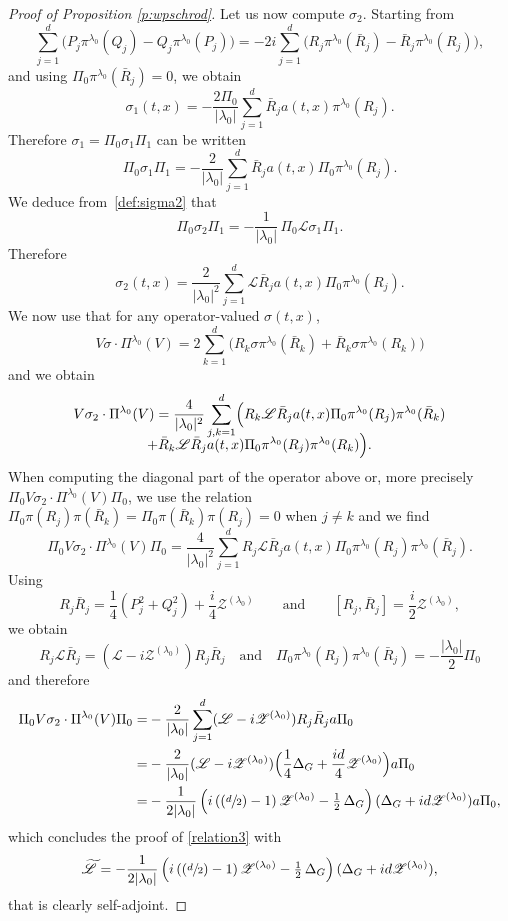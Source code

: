 \documentclass[JEP,XML,SOM,Unicode,published]{cedram}
\let\mathcal\mathscr
\newcommand{\Psfrac}[2]{(\sfrac{#1}{#2})}
\theoremstyle{plain}
\theoremstyle{definition}
\begin{document}
\begin{proof}[Proof of Proposition \ref{p:wpschrod}]
Let us now compute $\sigma_2$. Starting from
\[
\sum_{j=1}^d\bigl(P_j\pi^{\lambda_0}(Q_j)-Q_j \pi^{\lambda_0}(P_j)\bigr)
= -2 i \sum_{j=1}^d \bigl(R_j\pi^{\lambda_0}(\bar R_j)-\bar R_j \pi^{\lambda_0}(R_j)\bigr),
\]
and using $\Pi_0 \pi^{\lambda_0}(\bar R_j)=0$, we obtain
\[
\sigma_1(t,x)=-\frac{2\Pi_0}{|\lambda_0|} \sum_{j=1}^d \bar R_j a(t,x)\pi^{\lambda_0}(R_j).
\]
Therefore $\sigma_1=\Pi_0 \sigma_1 \Pi_1$ can be written
\[
\Pi_0 \sigma_1 \Pi_{1} = -\frac 2{|\lambda_0|} \sum_{j=1}^d \bar R_j a(t,x)\Pi_0\pi^{\lambda_0}(R_j).
\]
We deduce from~\eqref{def:sigma2} that
\[
\Pi_0 \sigma_2 \Pi_{1} =- \frac{1}{|\lambda_0|}\, \Pi_0\mathcal{L} \sigma_1\Pi_{1}.
\]
Therefore
\[
\sigma_2(t,x)= \frac {2} {|\lambda_0|^2 } \sum_{j=1}^d \mathcal{L} \bar R_j a(t,x)\Pi_0\pi^{\lambda_0}(R_j).
\]
We now use that for any operator-valued $\sigma(t,x)$,
\[
V\sigma\cdot \Pi^{\lambda_0}(V)= 2\sum_{k=1}^d \bigl(R_k\sigma\pi^{\lambda_0}(\bar R_k)+\bar R_k \sigma\pi^{\lambda_0}(R_k)\bigr)
\]
and we obtain
\begin{multline*}
V\sigma_2 \cdot \Pi^{\lambda_0}(V)=
\frac {4}{|\lambda_0|^2 } \sum_{j,k=1}^d \Bigl(R_k \mathcal{L} \bar R_j a(t,x)\Pi_0\pi^{\lambda_0}(R_j)\pi^{\lambda_0}(\bar R_k)\\[-8pt]
+ \bar R_k \mathcal{L} \bar R_j a(t,x)\Pi_0\pi^{\lambda_0}(R_j)\pi^{\lambda_0}(R_k)\Bigr).
\end{multline*}
When computing the diagonal part of the operator above or, more precisely $\Pi_0 V\sigma_2 \cdot \Pi^{\lambda_0}(V)\Pi_0$, we use the relation $\Pi_0\pi(R_j) \pi(\bar R_k) =\Pi_0\pi(\bar R_k) \pi(R_j)=0$ when $j\not=k$ and we find
\[
\Pi_0 V\sigma_2 \cdot \Pi^{\lambda_0}(V)\Pi_0=
\frac {4}{|\lambda_0|^2 } \sum_{j=1}^d R_j \mathcal{L} \bar R_j a(t,x)\Pi_0\pi^{\lambda_0}(R_j)\pi^{\lambda_0}(\bar R_j).
\]
Using
\[
R_j\bar R_j=\frac 14 (P_j^2+Q_j^2) +\frac i 4 \mathcal Z^{(\lambda_0)}
\quad \quad \text{and}\quad \quad [R_j,\bar R_j]=\frac{i}{2}\mathcal Z^{(\lambda_0)},
\]
we obtain
\[
R_j\mathcal{L}\bar R_j= (\mathcal L -i\mathcal Z^{(\lambda_0)}) R_j\bar R_j
\quad \text{and} \quad \Pi_0\pi^{\lambda_0}(R_j)\pi^{\lambda_0}(\bar R_j)=
-\frac{|\lambda_0|} 2 \Pi_0
\]
and therefore
\begin{align*}
\Pi_0 V\sigma_2 \cdot \Pi^{\lambda_0}(V)\Pi_0=& -\frac 2 {|\lambda_0|} \sum_{j=1}^d (\mathcal L -i\mathcal Z^{(\lambda_0)})R_j \bar R_j a\Pi_0\\
=& -\frac 2 {|\lambda_0|} (\mathcal L -i\mathcal Z^{(\lambda_0)})\Bigl(\frac 14 \Delta_G + \frac {id}4 \mathcal Z^{(\lambda_0)}\Bigr) a \Pi_0\\
=& -\frac 1 {2|\lambda_0|}\left(i\left(\Psfrac d2 -1\right) \mathcal Z^{(\lambda_0)}-\tfrac 12\, \Delta_G\right) (\Delta_G +id \mathcal Z^{(\lambda_0)})a \Pi_0,
\end{align*}
which concludes the proof of \eqref{relation3} with
\[
\widetilde{\mathcal L}= -\frac 1 {2|\lambda_0|}\left(i\left(\Psfrac d2 -1\right) \mathcal Z^{(\lambda_0)}-\tfrac 12\, \Delta_G\right) (\Delta_G +id \mathcal Z^{(\lambda_0)}),
\]
that is clearly self-adjoint.
\end{proof}
\end{document}
